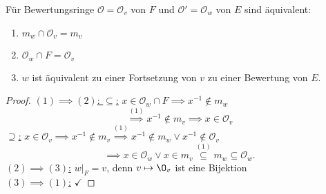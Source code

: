 \begin{lemma}
    Für Bewertungsringe $\mathcal{O}=\mathcal{O}_v$ von $F$ und $\mathcal{O}' = \mathcal{O}_w$ von $E$ sind äquivalent:
    \begin{enumerate}[label=(\arabic*)]
        \item $m_w \cap \mathcal{O}_v = m_v$
        \item $\mathcal{O}_w \cap F = \mathcal{O}_v$
        \item $w$ ist äquivalent zu einer Fortsetzung von $v$ zu einer Bewertung von $E$.
    \end{enumerate}
\end{lemma}
\begin{proof}
    \underline{$(1) \implies (2)$: $\subseteq$:} $x \in \mathcal{O}_w \cap F \implies x^{-1} \notin m_w$
    $$ \stackrel{(1)}{\implies} x^{-1} \notin m_v \implies x \in \mathcal{O}_v$$
    \underline{$\supseteq$:} $x \in \mathcal{O}_v \implies x^{-1} \notin m_v \stackrel{(1)}{\implies} x^{-1} \notin m_w \lor x^{-1} \notin \mathcal{O}_v$
    $$ \implies x \in \mathcal{O}_w \lor x \in m_v \stackrel{(1)}{\subseteq} m_w \subseteq \mathcal{O}_w.$$ 
    \underline{$(2) \implies (3)$:} $ w|_F = v$, denn $v \mapsto \O_v$ ist eine Bijektion\\
    \underline{$(3) \implies (1)$:} $\checkmark$
\end{proof}

